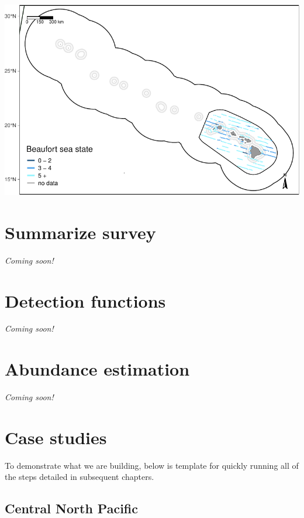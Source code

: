 \documentclass[
]{book}
\begin{document}
\includegraphics{figures/unnamed-chunk-49-1.pdf}

\hypertarget{summarize}{%
\chapter{Summarize survey}\label{summarize}}

\emph{Coming soon!}

\hypertarget{df}{%
\chapter{Detection functions}\label{df}}

\emph{Coming soon!}

\hypertarget{abundance}{%
\chapter{Abundance estimation}\label{abundance}}

\emph{Coming soon!}

\hypertarget{casestudies}{%
\chapter{Case studies}\label{casestudies}}

To demonstrate what we are building, below is template for quickly running all of the steps detailed in subsequent chapters.

\hypertarget{central-north-pacific}{%
\section*{Central North Pacific}\label{central-north-pacific}}
\end{document}
